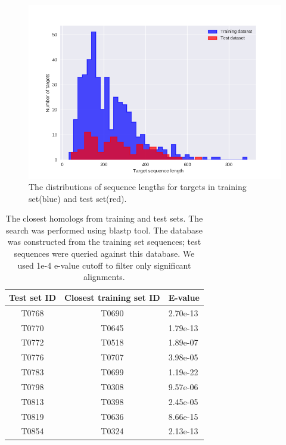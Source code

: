 \begin{figure}[H]
    \centering
    \includegraphics[width=\linewidth]{Fig/datasetLengthDistributions.png}
    \caption{The distributions of sequence lengths for targets in training set(blue) and test set(red).}
    \label{Fig:dataLengthDist}
\end{figure}

\begin{table}[H]
\begin{center}
\begin{tabular}{ c | c | l }
    
    Test set ID & Closest training set ID & E-value \\
    \hline
    T0768 & T0690 & 2.70e-13\\
    T0770 & T0645 & 1.79e-13\\
    T0772 & T0518 & 1.89e-07\\
    T0776 & T0707 & 3.98e-05\\
    T0783 & T0699 & 1.19e-22\\
    T0798 & T0308 & 9.57e-06\\
    T0813 & T0398 & 2.45e-05\\
    T0819 & T0636 & 8.66e-15\\
    T0854 & T0324 & 2.13e-13\\
\end{tabular}
    
    \caption {The closest homologs from training and test sets. The search was performed using blastp tool. The database was constructed from 
    the training set sequences; test sequences were queried against this database. We used 1e-4 e-value cutoff to filter only significant 
    alignments.}
    \label{Tbl:datasetsSimilarity}
\end{center}
\end{table}


